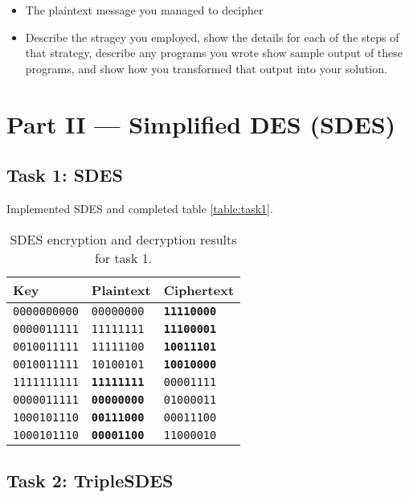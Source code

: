 \documentclass[a4paper,english,12pt]{article}
\begin{document}
\begin{itemize}
  \item The plaintext message you managed to decipher
  \item Describe the stragey you employed, show the details for each of the
    steps of that strategy, describe any programs you wrote show sample output
    of these programs, and show how you transformed that output into your
    solution.
\end{itemize}

\section{Part II --- Simplified DES (SDES)}

\subsection{Task 1: SDES}

Implemented SDES \cite{stallings2006cryptography} and completed table
\vref{table:task1}.

\begin{table}
  \centering
  \begin{tabular}{@{}lll@{}}
    \toprule
    Key &
    Plaintext &
    Ciphertext \\
    \midrule
    \texttt{0000000000} & \texttt{00000000} & \texttt{\textbf{11110000}} \\
    \texttt{0000011111} & \texttt{11111111} & \texttt{\textbf{11100001}} \\
    \texttt{0010011111} & \texttt{11111100} & \texttt{\textbf{10011101}} \\
    \texttt{0010011111} & \texttt{10100101} & \texttt{\textbf{10010000}} \\
    \texttt{1111111111} & \texttt{\textbf{11111111}} & \texttt{00001111} \\
    \texttt{0000011111} & \texttt{\textbf{00000000}} & \texttt{01000011} \\
    \texttt{1000101110} & \texttt{\textbf{00111000}} & \texttt{00011100} \\
    \texttt{1000101110} & \texttt{\textbf{00001100}} & \texttt{11000010} \\
    \bottomrule
  \end{tabular}
  \caption{SDES encryption and decryption results for task 1.}
  \label{table:task1}
\end{table}

\subsection{Task 2: TripleSDES}
\end{document}
